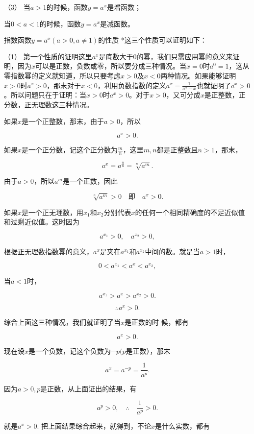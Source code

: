 （3） 当\(a > 1\)的时候，函数\(y = a^x\)是增函数；

当\(0 < a < 1\)的时候，函数\(y=a^x\)是减函数。

指数函数\(y = a^x (a > 0, a \neq 1)\)的性质 *这三个性质可以证明如下：

（1）
第一个性质的证明这里\(a^x\)是底数大于0的幂，我们只需应用幂的意义来证明，因为\(x\)可以是正数，负数或零，所以要分成三种情况。当\(x = 0\)时\(a^0 = 1\)，这从零指数幂的定义就知道，所以只要考虑\(x > 0\)及\(x < 0\)两种情况。如果能够证明\(x > 0\)时\(a^x > 0\)，那末对于\(x < 0\)，利用负数指数的定义\(a^x = \frac{1}{a^x - x}\)也就证明了\(a^x > 0\)。所以问题只在于证明：当\(x > 0\)时\(a^x > 0\)。对于\(x > 0\)，又可分成\(x\)是正整数，正分数，正无理数这三种情况。

如果\(x\)是一个正整数，那末，由于\(a > 0\)，所以

\[
a^{x} > 0.
\]

如果\(x\)是一个正分数，记这个正分数为\(\frac{m}{n}\)，这里\(m, n\)都是正整数且\(n > 1\)，那末，

\[
a^{x} = a^{\frac{n}{n}} = \sqrt[n]{a^{m}}.
\]

由于\(a > 0\)，所以\(a^m\)是一个正数，因此

\[
\sqrt[n]{a^{m}} > 0 \quad \text{即} \quad a^{x} > 0.
\]

如果\(x\)是一个正无理数，用\(x_{1}\)和\(x_{2}\)分别代表\(x\)的任何一个相同精确度的不足近似值和过剩近似值。这时因为

\[
a^{x_{1}} > 0, \quad a^{x_{2}} > 0,
\]

根据正无理数指数幂的意义，\(a^{x}\)是夹在\(a^{x_{1}}\)和\(a^{x_{2}}\)中间的数。就是当\(a > 1\)时，

\[
0 < a^{x_{1}} < a^{x} < a^{x_{2}},
\]

当\(a < 1\)时，

\[
a^{x_{1}} > a^{x} > a^{x_{2}} > 0.
\]

\[
\therefore a^{x} > 0.
\]

综合上面这三种情况，我们就证明了当\(x\)是正数的时 候，都有

\[
a^{x} > 0.
\]

现在设\(x\)是一个负数，记这个负数为\(-p(p\)是正数），那末

\[
a^{x} = a^{- p} = \frac{1}{a^{p}}.
\]

因为\(a > 0, p\)是正数，从上面证出的结果，有

\[
a^{p} > 0, \quad \therefore \quad \frac{1}{a^{p}} > 0.
\]

就是\(a^x > 0.\) 把上面结果综合起来，就得到，不论\(x\)是什么实数，都有

